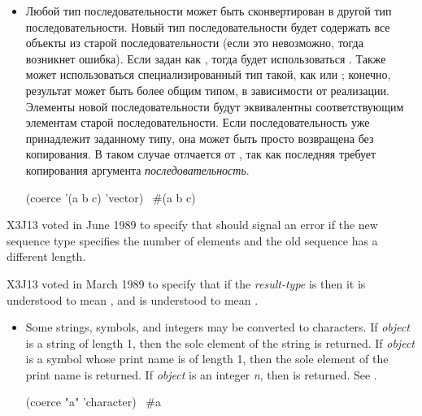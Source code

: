 \begin{defun}[Function]
\begin{itemize}
\item
Любой тип последовательности может быть сконвертирован в другой тип
последовательности. Новый тип последовательности будет содержать все
 объекты из старой последовательности (если это невозможно, тогда возникнет
ошибка). Если  задан как , тогда будет использоваться
. Также может использоваться специализированный тип такой, как  или ; конечно, результат может быть более общим типом, в
зависимости от реализации.
Элементы новой последовательности будут эквивалентны  соответствующим
элементам старой последовательности.
Если последовательность уже принадлежит заданному типу, она может быть просто
возвращена без копирования. В таком случае  отлчается от , так как последняя требует
копирования аргумента \textit{последовательность}.

\begin{lisp}
(coerce '(a b c) 'vector) \EV\ \#(a b c)
\end{lisp}

\end{itemize}

\begin{newer}
X3J13 voted in June 1989  to specify that
 should signal an error if the new sequence type specifies the
number of elements and the old sequence has a different length.
\end{newer}

\begin{newer}
X3J13 voted in March 1989 
to specify that if the \textit{result-type} is 
then it is understood to mean ,
and  is understood to mean .
\end{newer}

\begin{obsolete}
\begin{itemize}
\item
Some strings, symbols, and integers may be converted to characters.
If \textit{object} is a string of length 1, then the
sole element of the string is returned.  If \textit{object} is a symbol
whose print name is of length 1, then the sole element of the print name
is returned.  If \textit{object} is an integer \textit{n}, then 
is returned.  See .
\begin{lisp}
(coerce "a" 'character) \EV\ \#{\Xbackslash}a
\end{lisp}
\end{itemize}
\end{obsolete}


\end{defun}
